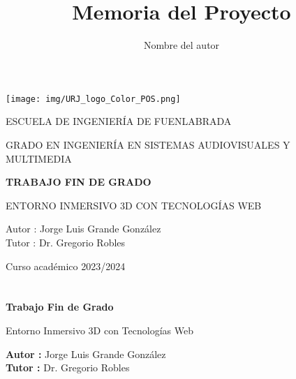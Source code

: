 \documentclass[a4paper, 12pt]{book}
\title{Memoria del Proyecto}
\author{Nombre del autor}
\begin{document}
\renewcommand{\refname}{Bibliografía}  %
\renewcommand{\appendixname}{Apéndice}



\begin{titlepage}
\begin{center}
\texttt{[image: img/URJ\_logo\_Color\_POS.png]}

\vspace{1.75cm}

\LARGE
ESCUELA DE INGENIERÍA DE FUENLABRADA
\vspace{1cm}

\LARGE
GRADO EN INGENIERÍA EN SISTEMAS AUDIOVISUALES Y MULTIMEDIA

\vspace{1cm}
\LARGE
\textbf{TRABAJO FIN DE GRADO}

\vspace{2cm}

\Large
ENTORNO INMERSIVO 3D CON TECNOLOGÍAS WEB

\vspace{2cm}

\large
Autor : Jorge Luis Grande González \\
Tutor : Dr. Gregorio Robles\\
\vspace{1cm}

\large
Curso académico 2023/2024

\end{center}
\end{titlepage}

\newpage
\mbox{}
\thispagestyle{empty} %



\clearpage
{}
\chapter*{}

\vspace{-4cm}
\begin{center}
\LARGE
\textbf{Trabajo Fin de Grado}

\vspace{1cm}
\large
Entorno Inmersivo 3D con Tecnologías Web

\vspace{1cm}
\large
\textbf{Autor :} Jorge Luis Grande González \\
\textbf{Tutor :} Dr. Gregorio Robles

\end{center}
\end{document}
